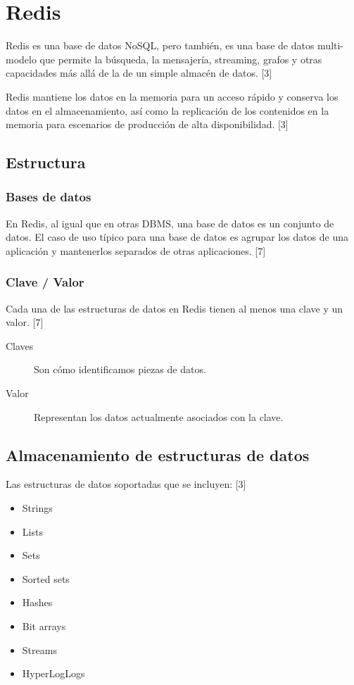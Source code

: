 \documentclass[twocolumn]{article}
\begin{document}
\section{Redis}

Redis es una base de datos NoSQL, pero también, es una base de datos multi-modelo que permite la búsqueda, la mensajería, streaming, grafos y otras capacidades más allá de la de un simple almacén de datos. [3]

Redis mantiene los datos en la memoria para un acceso rápido y conserva los datos en el almacenamiento, así como la replicación de los contenidos en la memoria para escenarios de producción de alta disponibilidad. [3]

\subsection{Estructura}

\subsubsection{Bases de datos}

En Redis, al igual que en otras DBMS, una base de datos es un conjunto de datos. El caso de uso típico para una base de datos es agrupar los datos de una aplicación y mantenerlos separados de otras aplicaciones. [7]

\subsubsection{Clave / Valor}

Cada una de las estructuras de datos en Redis tienen al menos una clave y un valor. [7]

\begin{description}
  \item[Claves] Son cómo identificamos piezas de datos.
  \item[Valor] Representan los datos actualmente asociados con la clave.
\end{description}

\subsection{Almacenamiento de estructuras de datos}

Las estructuras de datos soportadas que se incluyen: [3]

\begin{itemize}
  \item Strings
  \item Lists
  \item Sets
  \item Sorted sets
  \item Hashes
  \item Bit arrays
  \item Streams
  \item HyperLogLogs
\end{itemize}
\end{document}
